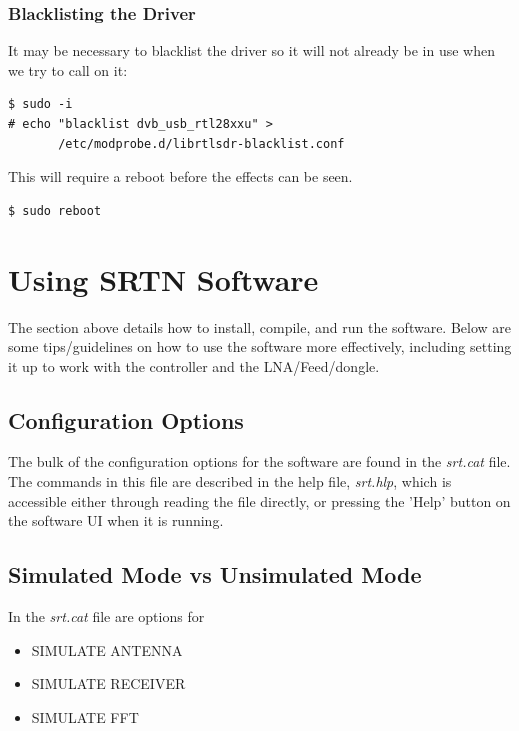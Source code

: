 \documentclass[11pt]{article} %
\begin{document}
\subsubsection{Blacklisting the Driver}

It may be necessary to blacklist the driver so it will not already be in use when we try to call on it:

\begin{lstlisting}[frame=single]
$ sudo -i
# echo "blacklist dvb_usb_rtl28xxu" > 
       /etc/modprobe.d/librtlsdr-blacklist.conf
\end{lstlisting}
This will require a reboot before the effects can be seen.
\begin{lstlisting}[frame=single]
$ sudo reboot
\end{lstlisting}


\newpage 
\section{Using SRTN Software}

The section above details how to install, compile, and run the software. Below are some tips/guidelines on how to use the software more effectively, including setting it up to work with the controller and the LNA/Feed/dongle.
\vspace{1cm}
\subsection{Configuration Options}

The bulk of the configuration options for the software are found in the \emph{srt.cat} file. The commands in this file are described in the help file, \emph{srt.hlp}, which is accessible either through reading the file directly, or pressing the 'Help' button on the software UI when it is running. 

\vspace{1cm}
\subsection{Simulated Mode vs Unsimulated Mode}

In the \emph{srt.cat} file are options for 

\begin{itemize}
\item SIMULATE ANTENNA
\item SIMULATE RECEIVER
\item SIMULATE FFT
\end{itemize}
\end{document}
